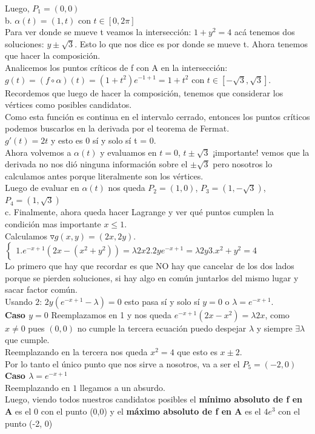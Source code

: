 \documentclass[10pt,a4paper]{article}
\begin{document}
Luego, $P_{1} = (0,0)$ \\
b. $\alpha(t) = (1,t)$ con $ t \in [0, 2\pi]$ \\
Para ver donde se mueve t veamos la intersección: $1+y^{2} = 4$ acá tenemos dos soluciones: $ y \pm \sqrt{3}$. Esto lo que nos dice es por donde se mueve t. Ahora tenemos que hacer la composición. \\
Analicemos los puntos críticos de f con A en la intersección: $g(t) = (f \circ \alpha)(t) = (1+t^{2})e^{-1+1} = 1 + t^{2}$ con $t \in [-\sqrt{3}, \sqrt{3}]$. \\
Recordemos que luego de hacer la composición, tenemos que considerar los vértices como posibles candidatos. \\
Como esta función es continua en el intervalo cerrado, entonces los puntos críticos podemos buscarlos en la derivada por el teorema de Fermat. \\
$g'(t) = 2t$ y esto es 0 sí y solo sí t = 0. \\
Ahora volvemos a $\alpha(t)$ y evaluamos en $t=0$, $t \pm \sqrt{3}$ ¡importante! vemos que la derivada no nos dió ninguna información sobre el $\pm \sqrt{3}$ pero nosotros lo calculamos antes porque literalmente son los vértices. \\
Luego de evaluar en $\alpha(t)$ nos queda $P_{2} = (1,0)$, $P_{3} = (1, -\sqrt{3})$, $P_{4} = (1, \sqrt{3})$ \\
c. Finalmente, ahora queda hacer Lagrange y ver qué puntos cumplen la condición mas importante $x \le 1$. \\
Calculamos $\triangledown g(x,y) = (2x, 2y)$. \\
$
\begin{cases}
    1. e^{-x+1}(2x-(x^{2}+ y^{2})) = \lambda 2x 
    2. 2ye^{-x+1} = \lambda 2y 
    3. x^{2} + y^{2} = 4  
\end{cases}
$ \\
Lo primero que hay que recordar es que NO hay que cancelar de los dos lados porque se pierden soluciones, si hay algo en común juntarlos del mismo lugar y sacar factor común. \\
Usando $2$: $2y(e^{-x+1}-\lambda) = 0$ esto pasa sí y solo sí $y = 0$ o $\lambda = e^{-x+1}$. \\
\textbf{Caso $y = 0$}
Reemplazamos en 1 y nos queda $e^{-x+1}(2x-x^{2}) = \lambda 2x$, como $x \neq 0$ pues $(0,0)$ no cumple la tercera ecuación puedo despejar $\lambda$ y siempre $\exists \lambda$ que cumple. \\
Reemplazando en la tercera nos queda $x^{2} = 4$ que esto es $x \pm 2$. \\
Por lo tanto el único punto que nos sirve a nosotros, va a ser el $P_{5} = (-2, 0)$ \\
\textbf{Caso $\lambda = e^{-x+1}$} \\
Reemplazando en $1$ llegamos a un absurdo. \\
Luego, viendo todos nuestros candidatos posibles el \textbf{mínimo absoluto de f en A} es el 0 con el punto (0,0) y el \textbf{máximo absoluto de f en A} es el $4e^{3}$ con el punto (-2, 0) 
\end{document}
